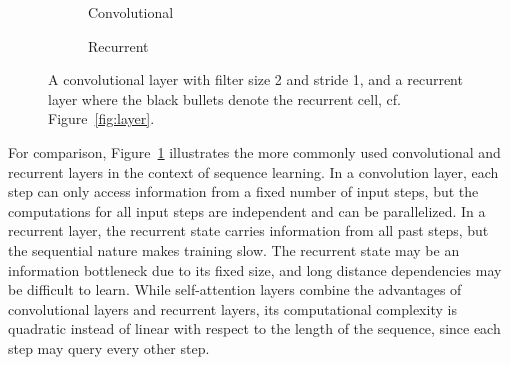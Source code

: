 \documentclass[11pt]{article}
\begin{document}
\begin{figure}
  \begin{subfigure}{0.5\textwidth}
    \centering
    \caption*{Convolutional}
  \end{subfigure}%
  \begin{subfigure}{0.5\textwidth}
    \centering
    \caption*{Recurrent}
  \end{subfigure}
  \caption[]{\label{fig:conv-rec}A convolutional layer with filter size 2 and stride 1,
    and a recurrent layer where the black bullets denote the recurrent cell,
    cf. Figure~\ref{fig:layer}.}
\end{figure}

For comparison, Figure~\ref{fig:conv-rec} illustrates the more commonly used convolutional and recurrent layers
in the context of sequence learning.
In a convolution layer, each step can only access information from a fixed number of input steps,
but the computations for all input steps are independent and can be parallelized.
In a recurrent layer, the recurrent state carries information from all past steps,
but the sequential nature makes training slow.
The recurrent state may be an information bottleneck due to its fixed size,
and long distance dependencies may be difficult to learn.
While self-attention layers combine the advantages of convolutional layers and recurrent layers,
its computational complexity is quadratic instead of linear with respect to the length of the sequence,
since each step may query every other step.
\end{document}
